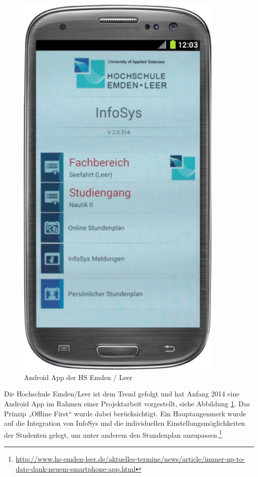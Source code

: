 \begin{figure}[h!]
	\centering
	\includegraphics[width=10cm]{kapitel/gruppe1_2/bilder/hsel-androidapp}
	\caption{Android App der HS Emden / Leer}
	\label{fig_hselandroidapp}
\end{figure}

Die Hochschule Emden/Leer ist dem Trend gefolgt und hat Anfang 2014 eine Android App im Rahmen einer Projektarbeit vorgestellt, siehe Abbildung \ref{fig_hselandroidapp}. Das Prinzip „Offline First“ wurde dabei berücksichtigt. Ein Hauptaugenmerk wurde auf die Integration von InfoSys und die individuellen Einstellungsmöglichkeiten der Studenten gelegt, um unter anderem den Stundenplan anzupassen.\footnote{\url{http://www.hs-emden-leer.de/aktuelles-termine/news/article/immer-up-to-date-dank-neuem-smartphone-app.html}}

